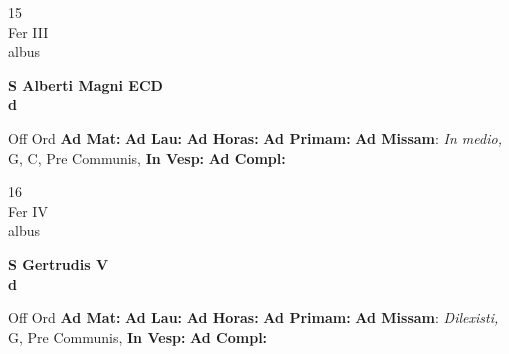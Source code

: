\documentclass[10pt, openany]{book}
\begin{document}
    \begin{center}
        \begin{minipage}{3.5in}
            \vspace{2em}
            \begin{minipage}{0.5in}
                {\Huge 15} \\
                {\normalsize Fer III} \\
                {\normalsize albus}
            \end{minipage}
            \begin{minipage}{3.0in}
                \textbf{ \large S Alberti Magni ECD \\
                \textnormal{\normalsize d}} \\ 
            \end{minipage}
            \begin{justify}Off Ord
                \textbf{Ad Mat: }
                \textbf{Ad Lau: }
                \textbf{Ad Horas: }
                \textbf{Ad Primam: }\textbf{Ad Missam}: \textit{In medio,} G, C, Pre Communis,  
                \textbf{In Vesp: }
                \textbf{Ad Compl: }
            \end{justify}
        \end{minipage}
    \end{center}

    \begin{center}
        \begin{minipage}{3.5in}
            \vspace{2em}
            \begin{minipage}{0.5in}
                {\Huge 16} \\
                {\normalsize Fer IV} \\
                {\normalsize albus}
            \end{minipage}
            \begin{minipage}{3.0in}
                \textbf{ \large S Gertrudis V \\
                \textnormal{\normalsize d}} \\ 
            \end{minipage}
            \begin{justify}Off Ord
                \textbf{Ad Mat: }
                \textbf{Ad Lau: }
                \textbf{Ad Horas: }
                \textbf{Ad Primam: }\textbf{Ad Missam}: \textit{Dilexisti,} G, Pre Communis,  
                \textbf{In Vesp: }
                \textbf{Ad Compl: }
            \end{justify}
        \end{minipage}
    \end{center}
\end{document}
